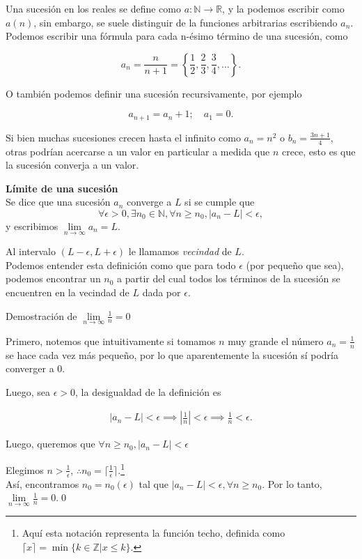 \documentclass[12pt]{book}
\begin{document}
Una sucesión en los reales se define como $a:\mathbb{N}\rightarrow\mathbb{R}$, y la podemos escribir como $a(n)$, sin embargo, se suele distinguir de la funciones arbitrarias escribiendo $a_n$.\\

Podemos escribir una fórmula para cada n-ésimo término de una sucesión, como

\[
a_n=\frac{n}{n+1}=\left\{\frac{1}{2},\frac{2}{3},\frac{3}{4},\dots\right\}.
\]

O también podemos definir una sucesión recursivamente, por ejemplo

\[
    a_{n+1}=a_n+1;\quad a_1=0.
\]

Si bien muchas sucesiones crecen hasta el infinito como $a_n=n^2$ o $b_n=\frac{3n+1}{4}$, otras podrían acercarse a un valor en particular a medida que $n$ crece, esto es que la sucesión converja a un valor.

\begin{definitionenv}
    \textbf{Límite de una sucesión}\\
    Se dice que una sucesión $a_n$ converge a $L$ si se cumple que
    \[
        \forall \epsilon >0,\exists n_0\in \mathbb{N}, \forall n\ge n_0, |a_n-L|<\epsilon,
    \]
    y escribimos $\lim\limits_{n\to\infty}a_n=L$.
\end{definitionenv}

Al intervalo $(L-\epsilon, L+\epsilon)$ le llamamos \textit{vecindad} de $L$.\\

Podemos entender esta definición como que para todo $\epsilon$ (por pequeño que sea), podemos encontrar un $n_0$ a partir del cual todos los términos de la sucesión se encuentren en la vecindad de $L$ dada por $\epsilon$.\\

\begin{exampleenv}
Demostración de $\lim\limits_{n\to\infty}\frac{1}{n}=0$

Primero, notemos que intuitivamente si tomamos $n$ muy grande el número $a_n=\frac{1}{n}$ se hace cada vez más pequeño, por lo que aparentemente la sucesión sí podría converger a 0.

Luego, sea $\epsilon >0$, la desigualdad de la definición es 

\begin{align*}
    |a_n-L|<\epsilon
    \implies \left|\frac{1}{n} \right| <\epsilon
    \implies \frac{1}{n}<\epsilon.
\end{align*}

Luego, queremos que $\forall n\ge n_0, |a_n-L|<\epsilon$

Elegimos $n>\frac{1}{\epsilon}$, $\therefore n_0=\lceil \frac{1}{\epsilon} \rceil$.\footnote{Aquí esta notación representa la función techo, definida como $\lceil x\rceil=\min\{k\in \mathbb{Z}|x\leq k\}$.}\\

Así, encontramos $n_0 =n_0(\epsilon)$ tal que $|a_n-L|<\epsilon, \forall n\ge n_0$. Por lo tanto, $\lim\limits_{n\to\infty}\frac{1}{n}=0$.\qed
\end{exampleenv}
\end{document}
